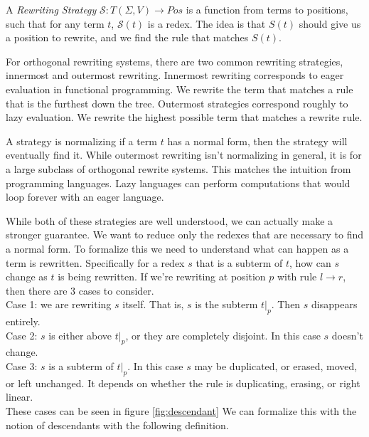 \documentclass{book}
\theoremstyle{definition}
\begin{document}
A \textit{Rewriting Strategy} $\mathcal{S} : T(\Sigma, V) \to Pos$ is a function from terms to positions,
such that for any term $t$, $\mathcal{S}(t)$ is a redex.
The idea is that $S(t)$ should give us a position to rewrite, and we find the rule that matches $S(t)$.

For orthogonal rewriting systems, there are two common rewriting strategies,
innermost and outermost rewriting.
Innermost rewriting corresponds to eager evaluation in functional programming.
We rewrite the term that matches a rule that is the furthest down the tree.
Outermost strategies correspond roughly to lazy evaluation.
We rewrite the highest possible term that matches a rewrite rule.

A strategy is normalizing if a term $t$ has a normal form, then the strategy will eventually find it.
While outermost rewriting isn't normalizing in general, it is for a large subclass of orthogonal rewrite systems.
This matches the intuition from programming languages.
Lazy languages can perform computations that would loop forever with an eager language.

While both of these strategies are well understood, we can actually make a stronger guarantee.
We want to reduce only the redexes that are necessary to find a normal form.
To formalize this we need to understand what can happen as a term is rewritten.
Specifically for a redex $s$ that is a subterm of $t$, how can $s$ change as $t$ is being rewritten.
If we're rewriting at position $p$ with rule $l \to r$, then there are 3 cases to consider.\\
Case 1: we are rewriting $s$ itself.  That is, $s$ is the subterm $t\vert_p$.
Then $s$ disappears entirely.\\
Case 2: $s$ is either above $t\vert_p$, or they are completely disjoint.
In this case $s$ doesn't change.\\
Case 3: $s$ is a subterm of $t\vert_p$.
In this case $s$ may be duplicated, or erased, moved, or left unchanged.
It depends on whether the rule is duplicating, erasing, or right linear.\\
These cases can be seen in figure \ref{fig:descendant}
We can formalize this with the notion of descendants with the following definition.
\end{document}
